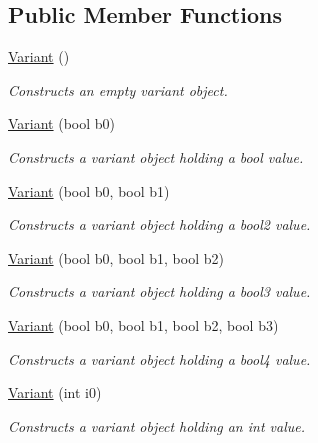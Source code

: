 \subsection*{Public Member Functions}
\begin{DoxyCompactItemize}
\item 
\hyperlink{structembree_1_1_variant_a89e8d81ee473e502a9cb40059496aef8}{Variant} ()
\begin{DoxyCompactList}\small\item\em Constructs an empty variant object. \item\end{DoxyCompactList}\item 
\hyperlink{structembree_1_1_variant_a577af997bd9e3e1b9abf9adbee470e38}{Variant} (bool b0)
\begin{DoxyCompactList}\small\item\em Constructs a variant object holding a bool value. \item\end{DoxyCompactList}\item 
\hyperlink{structembree_1_1_variant_a3a7f0a2290b1ff5bd323a298dd02c552}{Variant} (bool b0, bool b1)
\begin{DoxyCompactList}\small\item\em Constructs a variant object holding a bool2 value. \item\end{DoxyCompactList}\item 
\hyperlink{structembree_1_1_variant_a1faa589c6466865be47ad32af8fcbc1b}{Variant} (bool b0, bool b1, bool b2)
\begin{DoxyCompactList}\small\item\em Constructs a variant object holding a bool3 value. \item\end{DoxyCompactList}\item 
\hyperlink{structembree_1_1_variant_a86f7c957a0cd31cd62f08b3e1ac65649}{Variant} (bool b0, bool b1, bool b2, bool b3)
\begin{DoxyCompactList}\small\item\em Constructs a variant object holding a bool4 value. \item\end{DoxyCompactList}\item 
\hyperlink{structembree_1_1_variant_a742da9f1250f7c601ba8f24305d8767e}{Variant} (int i0)
\begin{DoxyCompactList}\small\item\em Constructs a variant object holding an int value. \item\end{DoxyCompactList}\item 

\end{DoxyCompactItemize}
